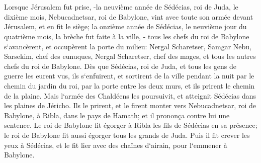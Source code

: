 \chapter{}

\verse Lorsque Jérusalem fut prise, -la neuvième année de Sédécias, roi de Juda, le dixième mois, Nebucadnetsar, roi de Babylone, vint avec toute son armée devant Jérusalem, et en fit le siège; 
\verse la onzième année de Sédécias, le neuvième jour du quatrième mois, la brèche fut faite à la ville, - 
\verse tous les chefs du roi de Babylone s`avancèrent, et occupèrent la porte du milieu: Nergal Scharetser, Samgar Nebu, Sarsekim, chef des eunuques, Nergal Scharetser, chef des mages, et tous les autres chefs du roi de Babylone. 
\verse Dès que Sédécias, roi de Juda, et tous les gens de guerre les eurent vus, ils s`enfuirent, et sortirent de la ville pendant la nuit par le chemin du jardin du roi, par la porte entre les deux murs, et ils prirent le chemin de la plaine. 
\verse Mais l`armée des Chaldéens les poursuivit, et atteignit Sédécias dans les plaines de Jéricho. Ils le prirent, et le firent monter vers Nebucadnetsar, roi de Babylone, à Ribla, dans le pays de Hamath; et il prononça contre lui une sentence. 
\verse Le roi de Babylone fit égorger à Ribla les fils de Sédécias en sa présence; le roi de Babylone fit aussi égorger tous les grands de Juda. 
\verse Puis il fit crever les yeux à Sédécias, et le fit lier avec des chaînes d`airain, pour l`emmener à Babylone. 
